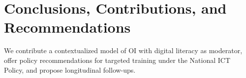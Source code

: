\chapter{Conclusions, Contributions, and Recommendations}
We contribute a contextualized model of OI with digital literacy as moderator, offer policy recommendations for targeted training under the National ICT Policy, and propose longitudinal follow-ups.
